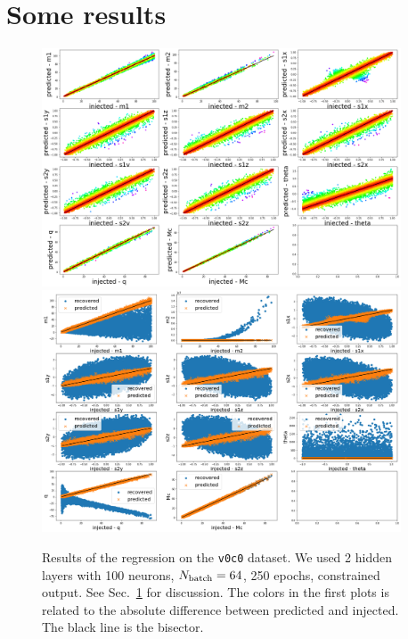 \documentclass[prd,aps,twocolumn,a4paper,showkeys,nofootinbib]{revtex4-1}
\begin{document}
\section{Some results}
\label{sec:some_results}
%
\begin{figure}[t]
  \center
  \includegraphics[width=0.95\textwidth]{./Figs/v0c0_regression.png}
  \includegraphics[width=0.95\textwidth]{./Figs/v0c0_regression_noise.png}
  \caption{\label{fig:v0c0_results} Results of the regression on the \texttt{v0c0}
  dataset. We used 2 hidden layers with 100 neurons, $N_{\rm batch}=64$, 250 epochs,  
  constrained output. See Sec.~\ref{sec:some_results} for discussion. 
  The colors in the first plots is related to the absolute difference between predicted 
  and injected. The black line is the bisector.}
\end{figure}
%
\end{document}
